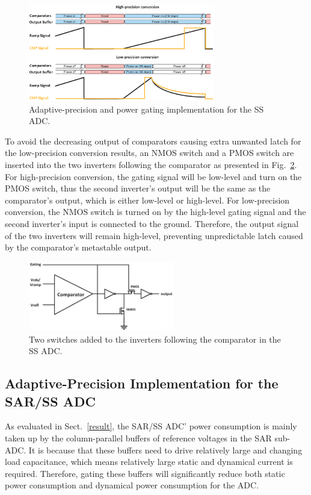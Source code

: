 \begin{figure}[htbp]
	\centerline{\includegraphics[width=3.2in]{./Figures/SS_pg.eps}}
	\caption{Adaptive-precision and power gating implementation for the SS ADC.}
	\label{SS_pg}
\end{figure} 

To avoid the decreasing output of comparators causing extra unwanted latch for the low-precision conversion results, an NMOS switch and a PMOS switch are inserted into the two inverters following the comparator as presented in Fig.~\ref{MATE}. 
For high-precision conversion, the gating signal will be low-level and turn on the PMOS switch, thus the second inverter's output will be the same as the comparator's output, which is either low-level or high-level. 
For low-precision conversion, the NMOS switch is turned on by the high-level gating signal and the second inverter's input is connected to the ground. Therefore, the output signal of the two inverters will remain high-level, preventing unpredictable latch caused by the comparator's metastable output.

\begin{figure}[htbp]
	\centerline{\includegraphics[width=2.5in]{./Figures/MATE.eps}}
	\caption{Two switches added to the inverters following the comparator in the SS ADC.}
	\label{MATE}
\end{figure} 

\subsection{Adaptive-Precision Implementation for the SAR/SS ADC}\label{gating3}

As evaluated in Sect.~\ref{result}, the SAR/SS ADC’ power consumption is mainly taken up by the column-parallel buffers of reference voltages in the SAR sub-ADC.
It is because that these buffers need to drive relatively large and changing load capacitance, which means relatively large static and dynamical current is required.
Therefore, gating these buffers will significantly reduce both static power consumption and dynamical power consumption for the ADC.

